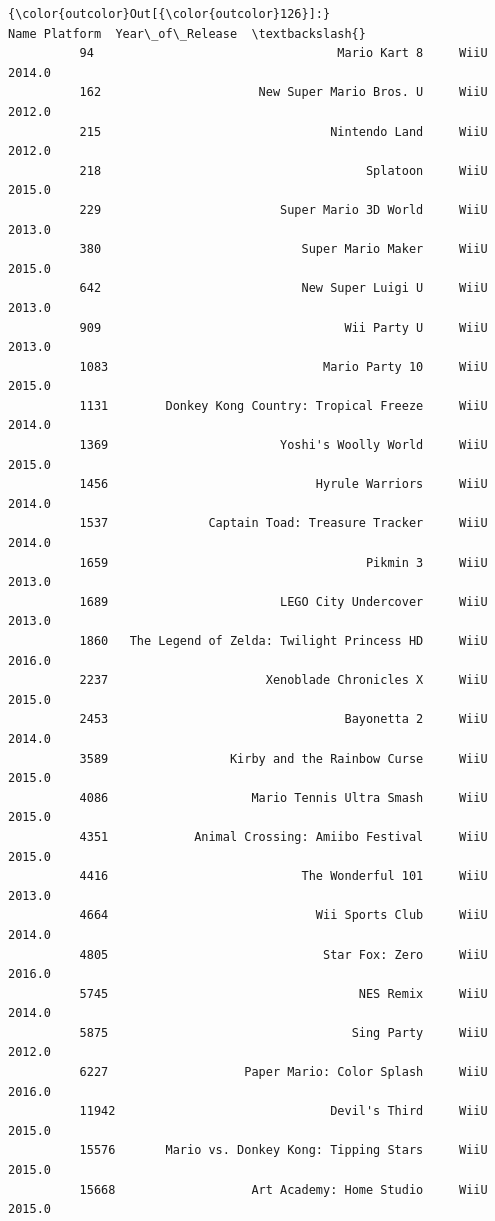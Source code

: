 \documentclass[11pt]{article}
\begin{document}
\begin{Verbatim}[commandchars=\\\{\}]
{\color{outcolor}Out[{\color{outcolor}126}]:}                                             Name Platform  Year\_of\_Release  \textbackslash{}
          94                                  Mario Kart 8     WiiU           2014.0   
          162                      New Super Mario Bros. U     WiiU           2012.0   
          215                                Nintendo Land     WiiU           2012.0   
          218                                     Splatoon     WiiU           2015.0   
          229                         Super Mario 3D World     WiiU           2013.0   
          380                            Super Mario Maker     WiiU           2015.0   
          642                            New Super Luigi U     WiiU           2013.0   
          909                                  Wii Party U     WiiU           2013.0   
          1083                              Mario Party 10     WiiU           2015.0   
          1131        Donkey Kong Country: Tropical Freeze     WiiU           2014.0   
          1369                        Yoshi's Woolly World     WiiU           2015.0   
          1456                             Hyrule Warriors     WiiU           2014.0   
          1537              Captain Toad: Treasure Tracker     WiiU           2014.0   
          1659                                    Pikmin 3     WiiU           2013.0   
          1689                        LEGO City Undercover     WiiU           2013.0   
          1860   The Legend of Zelda: Twilight Princess HD     WiiU           2016.0   
          2237                      Xenoblade Chronicles X     WiiU           2015.0   
          2453                                 Bayonetta 2     WiiU           2014.0   
          3589                 Kirby and the Rainbow Curse     WiiU           2015.0   
          4086                    Mario Tennis Ultra Smash     WiiU           2015.0   
          4351            Animal Crossing: Amiibo Festival     WiiU           2015.0   
          4416                           The Wonderful 101     WiiU           2013.0   
          4664                             Wii Sports Club     WiiU           2014.0   
          4805                              Star Fox: Zero     WiiU           2016.0   
          5745                                   NES Remix     WiiU           2014.0   
          5875                                  Sing Party     WiiU           2012.0   
          6227                   Paper Mario: Color Splash     WiiU           2016.0   
          11942                              Devil's Third     WiiU           2015.0   
          15576       Mario vs. Donkey Kong: Tipping Stars     WiiU           2015.0   
          15668                   Art Academy: Home Studio     WiiU           2015.0   
          

\end{Verbatim}
\end{document}
